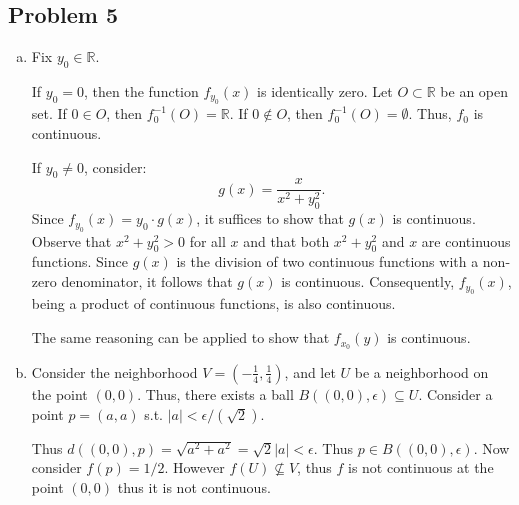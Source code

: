 \documentclass[12pt, letterpaper]{article}
\theoremstyle{definition}
\begin{document}
\subsection*{Problem 5}
\begin{enumerate}[(a)]
    \item Fix $y_0 \in \mathbb{R}$.

    If $y_0 = 0$, then the function $f_{y_0}(x)$ is identically zero. Let $O \subset \mathbb{R}$ be an open set. If $0 \in O$, then $f_0^{-1}(O) = \mathbb{R}$. If $0 \notin O$, then $f_0^{-1}(O) = \emptyset$. Thus, $f_0$ is continuous.

    If $y_0 \neq 0$, consider:
    \[
    g(x) = \frac{x}{x^2 + y_0^2}.
    \]
    Since $f_{y_0}(x) = y_0 \cdot g(x)$, it suffices to show that $g(x)$ is continuous. Observe that $x^2 + y_0^2 > 0$ for all $x$ and that both $x^2 + y_0^2$ and $x$ are continuous functions. Since $g(x)$ is the division of two continuous functions with a non-zero denominator, it follows that $g(x)$ is continuous. Consequently, $f_{y_0}(x)$, being a product of continuous functions, is also continuous.

    The same reasoning can be applied to show that $f_{x_0}(y)$ is continuous.

    \item Consider the neighborhood $V=(-\frac{1}{4},\frac{1}{4})$, and let $U$ be a neighborhood on the point $(0,0)$. Thus, there exists a ball $B((0,0),\epsilon) \subseteq U$. Consider a point $p=(a,a)$ s.t. $|a| < \epsilon/(\sqrt{2})$.
    
    Thus $d((0,0),p)=\sqrt{a^2+a^2}=\sqrt{2}|a| < \epsilon$. Thus $p \in B((0,0),\epsilon)$. Now consider $f(p)=1/2$. However $f(U) \nsubseteq V$, thus $f$ is not continuous at the point $(0,0)$ thus it is not continuous.
\end{enumerate}

\newpage
\end{document}
